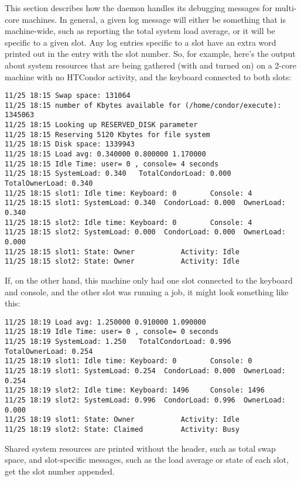 This section describes how the  daemon
handles its debugging messages for multi-core machines.
In general, a given log message will either be something that is
machine-wide, 
such as reporting the total system load average,
or it will be specific to a given slot.
Any log entries specific to a slot have an extra word 
printed out in the entry with the slot number.  
So, for example, here's the output about system resources that are
being gathered (with  and  turned on) on
a 2-core machine with no HTCondor activity, and the keyboard connected to
both slots:
\begin{verbatim}
11/25 18:15 Swap space: 131064
11/25 18:15 number of Kbytes available for (/home/condor/execute): 1345063
11/25 18:15 Looking up RESERVED_DISK parameter
11/25 18:15 Reserving 5120 Kbytes for file system
11/25 18:15 Disk space: 1339943
11/25 18:15 Load avg: 0.340000 0.800000 1.170000
11/25 18:15 Idle Time: user= 0 , console= 4 seconds
11/25 18:15 SystemLoad: 0.340   TotalCondorLoad: 0.000  TotalOwnerLoad: 0.340
11/25 18:15 slot1: Idle time: Keyboard: 0        Console: 4
11/25 18:15 slot1: SystemLoad: 0.340  CondorLoad: 0.000  OwnerLoad: 0.340
11/25 18:15 slot2: Idle time: Keyboard: 0        Console: 4
11/25 18:15 slot2: SystemLoad: 0.000  CondorLoad: 0.000  OwnerLoad: 0.000
11/25 18:15 slot1: State: Owner           Activity: Idle
11/25 18:15 slot2: State: Owner           Activity: Idle
\end{verbatim}

If, on the other hand, this machine only had one slot
connected to the keyboard and console, and the other slot was running a
job, it might look something like this:
\begin{verbatim}
11/25 18:19 Load avg: 1.250000 0.910000 1.090000
11/25 18:19 Idle Time: user= 0 , console= 0 seconds
11/25 18:19 SystemLoad: 1.250   TotalCondorLoad: 0.996  TotalOwnerLoad: 0.254
11/25 18:19 slot1: Idle time: Keyboard: 0        Console: 0
11/25 18:19 slot1: SystemLoad: 0.254  CondorLoad: 0.000  OwnerLoad: 0.254
11/25 18:19 slot2: Idle time: Keyboard: 1496     Console: 1496
11/25 18:19 slot2: SystemLoad: 0.996  CondorLoad: 0.996  OwnerLoad: 0.000
11/25 18:19 slot1: State: Owner           Activity: Idle
11/25 18:19 slot2: State: Claimed         Activity: Busy
\end{verbatim}

Shared system resources are printed without the header,
such as total swap space,
and slot-specific messages,
such as the load average or state of each slot,
get the slot number appended.  


